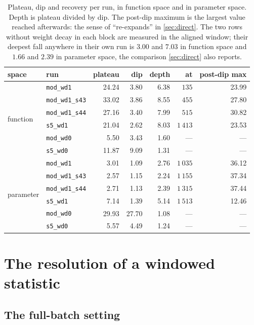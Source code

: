 \documentclass{article}
\begin{document}
\begin{table}[H]
\centering
\caption{Plateau, dip and recovery per run, in function space and in parameter space. Depth is
plateau divided by dip. The post-dip maximum is the largest value reached afterwards: the sense of
``re-expands'' in \cref{sec:direct}. The two rows without weight decay in each block are measured in the
aligned window;
their deepest fall anywhere in their own run is $3.00$ and $7.03$ in function space and $1.66$
and $2.39$ in parameter space, the comparison \cref{sec:direct} also reports.}
\label{tab:dip}
\begin{tabular}{llrrrrr}
\toprule
space & run & plateau & dip & depth & at & post-dip max \\
\midrule
\multirow{6}{*}{function}
 & \texttt{mod\_wd1}      & 24.24 & 3.80 & 6.38  & $135$   & 23.99 \\
 & \texttt{mod\_wd1\_s43} & 33.02 & 3.86 & 8.55 & $455$   & 27.80 \\
 & \texttt{mod\_wd1\_s44} & 27.16 & 3.40 & 7.99  & $515$   & 30.82 \\
 & \texttt{s5\_wd1}       & 21.04 & 2.62 & 8.03  & $1\,413$   & 23.53 \\
 & \texttt{mod\_wd0}      &  5.50 & 3.43 & 1.60  & ---      & --- \\
 & \texttt{s5\_wd0}       & 11.87 & 9.09 & 1.31  & ---      & --- \\
\midrule
\multirow{6}{*}{parameter}
 & \texttt{mod\_wd1}      &  3.01 & 1.09 & 2.76  & $1\,035$ & 36.12 \\
 & \texttt{mod\_wd1\_s43} &  2.57 & 1.15 & 2.24  & $1\,155$    & 37.34 \\
 & \texttt{mod\_wd1\_s44} &  2.71 & 1.13 & 2.39  & $1\,315$ & 37.44 \\
 & \texttt{s5\_wd1}       &  7.14 & 1.39 & 5.14  & $1\,513$    & 12.46 \\
 & \texttt{mod\_wd0}      & 29.93 & 27.70 & 1.08 & ---       & --- \\
 & \texttt{s5\_wd0}       &  5.57 & 4.49 & 1.24 & ---       & --- \\
\bottomrule
\end{tabular}
\end{table}

\section{The resolution of a windowed statistic}\label{app:resolution}

\subsection{The full-batch setting}\label{app:fb}
\end{document}
